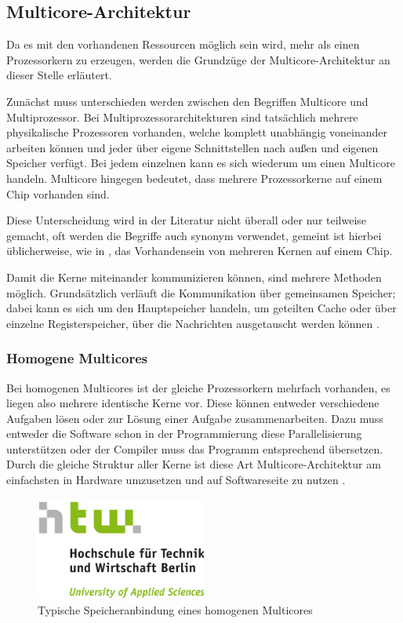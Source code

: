 \documentclass[11pt,a4paper,titlepage]{article}
\begin{document}
\subsection{Multicore-Architektur}

Da es mit den vorhandenen Ressourcen möglich sein wird, mehr als einen Prozessorkern zu erzeugen, werden die Grundzüge der Multicore-Architektur an dieser Stelle erläutert. 

Zunächst muss unterschieden werden zwischen den Begriffen Multicore und Multiprozessor. Bei Multiprozessorarchitekturen sind tatsächlich mehrere physikalische Prozessoren vorhanden, welche komplett unabhängig voneinander arbeiten können und jeder über eigene Schnittstellen nach außen und eigenen Speicher verfügt. Bei jedem einzelnen kann es sich wiederum um einen Multicore handeln. Multicore hingegen bedeutet, dass mehrere Prozessorkerne auf einem Chip vorhanden sind.

Diese Unterscheidung wird in der Literatur nicht überall oder nur teilweise gemacht, oft werden die Begriffe auch synonym verwendet, gemeint ist hierbei üblicherweise, wie in \cite[S. 345]{Hennessy}, das Vorhandensein von mehreren Kernen auf einem Chip.

Damit die Kerne miteinander kommunizieren können, sind mehrere Methoden möglich. Grundsätzlich verläuft die Kommunikation über gemeinsamen Speicher; dabei kann es sich um den Hauptspeicher handeln, um geteilten Cache oder über einzelne Registerspeicher, über die Nachrichten ausgetauscht werden können \cite{Roloff}.



\subsubsection{Homogene Multicores}

Bei homogenen Multicores ist der gleiche Prozessorkern mehrfach vorhanden, es liegen also mehrere identische Kerne vor. Diese können entweder verschiedene Aufgaben lösen oder zur Lösung einer Aufgabe zusammenarbeiten. Dazu muss entweder die Software schon in der Programmierung diese Parallelisierung unterstützen oder der Compiler muss das Programm entsprechend übersetzen. 
Durch die gleiche Struktur aller Kerne ist diese Art Multicore-Architektur am einfachsten in Hardware umzusetzen und auf Softwareseite zu nutzen \cite{Roloff}.

\begin{figure}[!ht]
\centering
\includegraphics[width=0.5\textwidth]{images/htw_hochschule.png}
\caption{Typische Speicheranbindung eines homogenen Multicores}
\label{img:MulticoreHomogen}
\end{figure}
\end{document}

